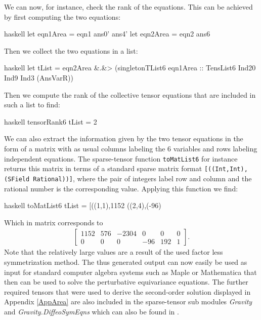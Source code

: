 \documentclass[a4paper,12pt, DIV=14, BCOR=5mm, twoside, headsepline, numbers=noenddot]{scrbook}
\begin{document}
We can now, for instance, check the rank of the equations. This can be achieved by first computing the two equations:
\begin{center}
\begin{cminted}{haskell}
let eqn1Area = eqn1 ans0' ans4' 
let eqn2Area = eqn2 ans6  
\end{cminted}
\end{center}
Then we collect the two equations in a list:
\begin{center}
\begin{cminted}{haskell}
let tList = eqn2Area &.&> (singletonTList6 eqn1Area ::
            TensList6 Ind20 Ind9 Ind3 (AnsVarR)) 
\end{cminted}
\end{center}
Then we compute the rank of the collective tensor equations that are included in such a list to find:
\begin{center}
\begin{cminted}{haskell}
tensorRank6 tList = 2 
\end{cminted}
\end{center}
We can also extract the information given by the two tensor equations in the form of a matrix with as usual columns labeling the 6 variables and rows labeling independent equations. The sparse-tensor function \texttt{toMatList6} for instance returns this matrix in terms of a standard sparse matrix format \texttt{[((Int,Int),(SField Rational))]}, where the pair of integers label row and column and the rational number is the corresponding value. Applying this function we find:
\begin{center}
\begin{cminted}{haskell}
toMatList6 tList = [((1,1),1152 %
                   ((2,4),(-96) %
\end{cminted}
\end{center}
Which in matrix corresponds to 
\begin{align}
    \begin{bmatrix}
    1152 & 576 & -2304 & 0 & 0 & 0 \\
    0 & 0 & 0 & -96 & 192 & 1
    \end{bmatrix}.
\end{align}
Note that the relatively large values are a result of the used factor less symmetrization method. The thus generated output can now easily be used as input for standard computer algebra systems such as Maple or Mathematica that then can be used to solve the perturbative equivariance equations.
The further required tensors that were used to derive the second-order solution displayed in Appendix \ref{AppArea}
are also included in the sparse-tensor sub modules \textit{Gravity} and \textit{Gravity.DiffeoSymEqns} which can also be found in \cite{sparse-tensor}. 
\end{document}

